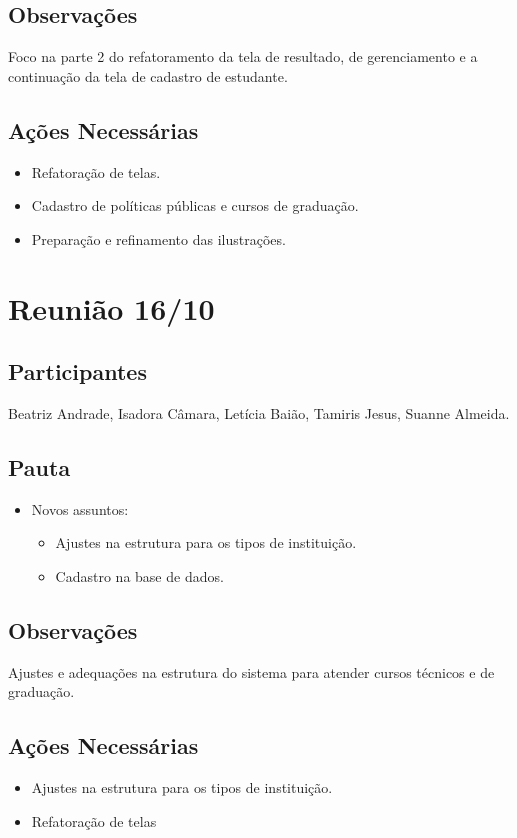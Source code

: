 \begin{apendicesenv}
\subsection*{Observações}
Foco na parte 2 do refatoramento da tela de resultado, de gerenciamento e a continuação da tela de cadastro de estudante. 

\subsection*{Ações Necessárias}
\begin{itemize}
    \item Refatoração de telas.
    \item Cadastro de políticas públicas e cursos de graduação.
    \item Preparação e refinamento das ilustrações.
\end{itemize}

\section*{Reunião 16/10}

\subsection*{Participantes}
Beatriz Andrade, Isadora Câmara, Letícia Baião, Tamiris Jesus, Suanne Almeida.

\subsection*{Pauta}
\begin{itemize}
    \item Novos assuntos:
    \begin{itemize}
        \item Ajustes na estrutura para os tipos de instituição.
        \item Cadastro na base de dados.
    \end{itemize}
\end{itemize}

\subsection*{Observações}
Ajustes e adequações na estrutura do sistema para atender cursos técnicos e de graduação.

\subsection*{Ações Necessárias}
\begin{itemize}
    \item Ajustes na estrutura para os tipos de instituição.
    \item Refatoração de telas
\end{itemize}


\end{apendicesenv}
